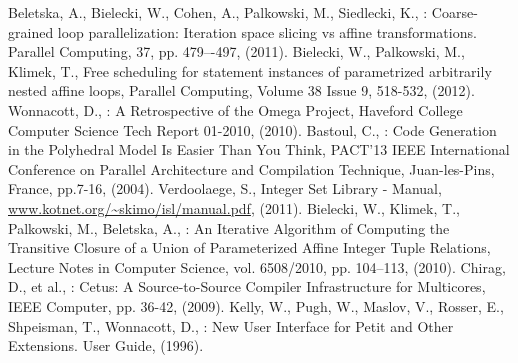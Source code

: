 \documentclass[a4paper,12pt]{book}
\begin{document}
\begin{thebibliography}{5}

 Beletska, A., Bielecki, W., Cohen, A., Palkowski, M., Siedlecki, K., : Coarse-grained loop parallelization:  Iteration space slicing vs affine transformations.  Parallel Computing, 37, pp. 479–-497, (2011).
 Bielecki, W., Palkowski, M., Klimek, T., Free scheduling for statement instances of parametrized arbitrarily nested affine loops, Parallel Computing, Volume 38 Issue 9, 518-532, (2012).
 Wonnacott, D., : A Retrospective of the Omega Project, Haveford College Computer Science Tech Report 01-2010, (2010).
 Bastoul, C., : Code Generation in the Polyhedral Model Is Easier Than You Think, PACT'13 IEEE International Conference on Parallel Architecture and Compilation Technique, Juan-les-Pins, France, pp.7-16, (2004).
 Verdoolaege, S., Integer Set Library - Manual, \url{www.kotnet.org/~skimo/isl/manual.pdf}, (2011).
 Bielecki, W., Klimek, T., Palkowski, M., Beletska, A., : An Iterative Algorithm of Computing the Transitive Closure of a Union of Parameterized Affine Integer Tuple Relations, Lecture Notes in Computer Science, vol. 6508/2010, pp. 104--113, (2010).
 Chirag, D., et al., : Cetus: A Source-to-Source Compiler Infrastructure for Multicores, IEEE Computer, pp. 36-42, (2009).
 Kelly, W., Pugh, W., Maslov, V., Rosser, E., Shpeisman, T., Wonnacott, D., : New User Interface for Petit and Other Extensions. User Guide, (1996).


\end{thebibliography}
\end{document}

